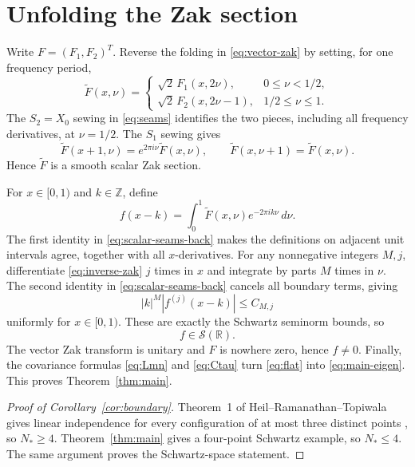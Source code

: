 \documentclass[11pt]{amsart}
\theoremstyle{remark}
\newcommand{\R}{\mathbb R}
\newcommand{\Z}{\mathbb Z}
\newcommand{\cS}{\mathcal S}
\begin{document}
\section{Unfolding the Zak section}\label{sec:inverse}

Write $F=(F_1,F_2)^T$.  Reverse the folding in \eqref{eq:vector-zak} by
setting, for one frequency period,
\begin{equation}\label{eq:unfold}
 \widetilde F(x,\nu)=
 \begin{cases}
  \sqrt2\,F_1(x,2\nu),&0\le\nu<1/2,\\
  \sqrt2\,F_2(x,2\nu-1),&1/2\le\nu\le1.
 \end{cases}
\end{equation}
The $S_2=X_0$ sewing in \eqref{eq:seams} identifies the two pieces, including
all frequency derivatives, at $\nu=1/2$.  The $S_1$ sewing gives
\begin{equation}\label{eq:scalar-seams-back}
 \widetilde F(x+1,\nu)=e^{2\pi i\nu}\widetilde F(x,\nu),
 \qquad
 \widetilde F(x,\nu+1)=\widetilde F(x,\nu).
\end{equation}
Hence $\widetilde F$ is a smooth scalar Zak section.

For $x\in[0,1)$ and $k\in\Z$, define
\begin{equation}\label{eq:inverse-zak}
 f(x-k)=\int_0^1\widetilde F(x,\nu)e^{-2\pi i k\nu}\,d\nu.
\end{equation}
The first identity in \eqref{eq:scalar-seams-back} makes the definitions on
adjacent unit intervals agree, together with all $x$-derivatives.  For any
nonnegative integers $M,j$, differentiate \eqref{eq:inverse-zak} $j$ times in
$x$ and integrate by parts $M$ times in $\nu$.  The second identity in
\eqref{eq:scalar-seams-back} cancels all boundary terms, giving
\[
 |k|^M|f^{(j)}(x-k)|\le C_{M,j}
\]
uniformly for $x\in[0,1)$.  These are exactly the Schwartz seminorm bounds,
so
\[
 f\in\cS(\R).
\]
The vector Zak transform is unitary and $F$ is nowhere zero, hence $f\ne0$.
Finally, the covariance formulas \eqref{eq:Lmn} and \eqref{eq:Ctau} turn
\eqref{eq:flat} into \eqref{eq:main-eigen}.  This proves
Theorem~\ref{thm:main}.

\begin{proof}[Proof of Corollary~\ref{cor:boundary}]
Theorem~1 of Heil--Ramanathan--Topiwala gives linear independence for every
configuration of at most three distinct points
\cite[pp.~2791--2792]{HRT96}, so $N_*\ge4$.  Theorem~\ref{thm:main} gives a
four-point Schwartz example, so $N_*\le4$.  The same argument proves the
Schwartz-space statement.
\end{proof}
\end{document}

